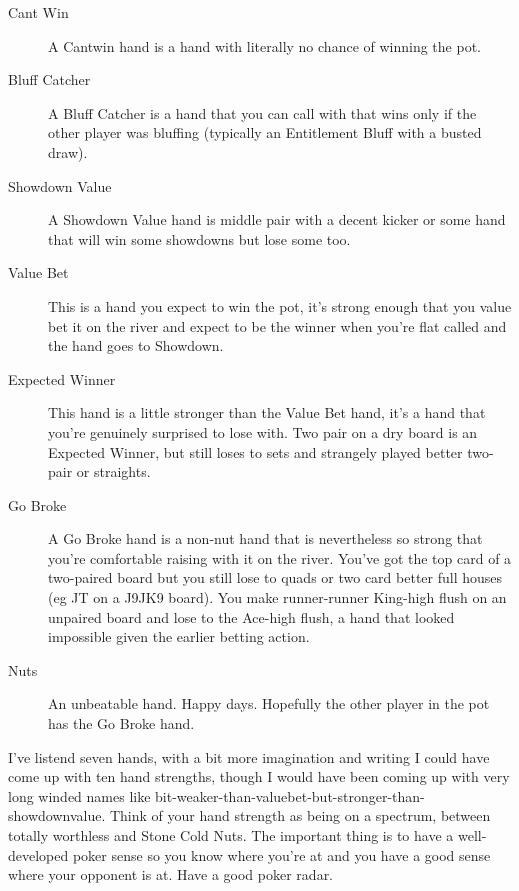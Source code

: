 \begin{description}

\item[Cant Win] A Cantwin hand is a hand with literally no chance of
winning the pot.

\item[Bluff Catcher] A Bluff Catcher is a hand that you can call with
that wins only if the other player was bluffing (typically an
Entitlement Bluff with a busted draw).

\item[Showdown Value] A Showdown Value hand is middle pair with a
decent kicker or some hand that will win some showdowns but lose some too.

\item[Value Bet] This is a hand you expect to win the pot, it's strong
enough that you value bet it on the river and expect to be the winner
when you're flat called and the hand goes to Showdown.

\item[Expected Winner] This hand is a little stronger than the Value
Bet hand, it's a hand that you're genuinely surprised to lose
with. Two pair on a dry board is an Expected Winner, but still loses
to sets and strangely played better two-pair or straights.

\item[Go Broke] A Go Broke hand is a non-nut hand that is nevertheless
so strong that you're comfortable raising with it on the river. You've
got the top card of a two-paired board but you still lose to quads or
two card better full houses (eg JT on a J9JK9 board). You make
runner-runner King-high flush on an unpaired board and lose to the
Ace-high flush, a hand that looked impossible given the earlier
betting action.

\item[Nuts] An unbeatable hand. Happy days. Hopefully the other player
in the pot has the Go Broke hand.

\end{description}


I've listend seven hands, with a bit more imagination and writing
I could have come up with ten hand strengths, though I would have been
coming up with very long winded names like
bit-weaker-than-valuebet-but-stronger-than-showdownvalue. Think of
your hand strength as being on a spectrum, between totally
worthless and Stone Cold Nuts. The important thing is to have
a well-developed poker sense so you know where you're at and you
have a good sense where your opponent is at. Have a good poker radar.
